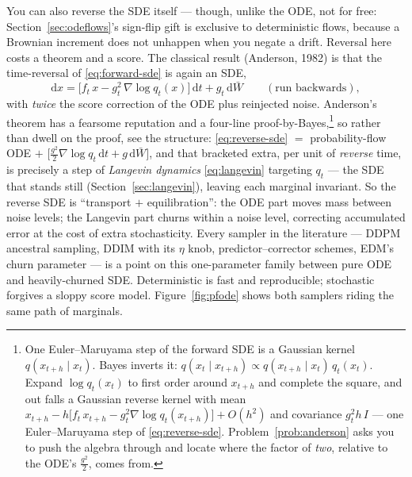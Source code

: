 \documentclass[10pt,a4paper]{article}
\newcommand{\dd}{\mathrm{d}}
\begin{document}
You can also reverse the SDE itself --- though, unlike the ODE, not for
free: Section~\ref{sec:odeflows}'s sign-flip gift is exclusive to
deterministic flows, because a Brownian increment does not unhappen when
you negate a drift. Reversal here costs a theorem and a score. The
classical result (Anderson, 1982)
is that the time-reversal of \eqref{eq:forward-sde} is again an SDE,
\begin{equation}
\dd x = \big[ f_t\, x - g_t^2\, \nabla\log q_t(x) \big]\, \dd t
+ g_t\, \dd \bar W \qquad (\text{run backwards}),
\label{eq:reverse-sde}
\end{equation}
with \emph{twice} the score correction of the ODE plus reinjected noise.
Anderson's theorem has a fearsome reputation and a four-line
proof-by-Bayes,\footnote{One Euler--Maruyama step of the forward SDE is
a Gaussian kernel $q(x_{t+h} \mid x_t)$. Bayes inverts it:
$q(x_t \mid x_{t+h}) \propto q(x_{t+h} \mid x_t)\, q_t(x_t)$. Expand
$\log q_t(x_t)$ to first order around $x_{t+h}$ and complete the square,
and out falls a Gaussian reverse kernel with mean
$x_{t+h} - h\big[ f_t\, x_{t+h} - g_t^2 \nabla\log q_t(x_{t+h}) \big] + O(h^2)$ and
covariance $g_t^2 h\, I$ --- one Euler--Maruyama step of
\eqref{eq:reverse-sde}. Problem~\ref{prob:anderson} asks you to push the
algebra through and locate where the factor of \emph{two}, relative to
the ODE's $\tfrac{g^2}{2}$, comes from.} so rather than dwell on the
proof, see the structure: \eqref{eq:reverse-sde}
$=$ probability-flow ODE $+$ $\big[\tfrac{g^2}{2}\nabla\log q_t\,\dd t +
g\,\dd\bar W\big]$, and that bracketed extra, per unit of \emph{reverse}
time, is precisely a step of
\emph{Langevin dynamics} \eqref{eq:langevin} targeting $q_t$ --- the SDE
that stands still (Section~\ref{sec:langevin}), leaving each marginal
invariant. So the reverse SDE is ``transport $+$ equilibration'':
the ODE part moves mass between noise levels; the Langevin part churns
within a noise level, correcting accumulated error at the cost of extra
stochasticity. Every sampler in the literature --- DDPM ancestral
sampling, DDIM with its $\eta$ knob, predictor--corrector schemes, EDM's
churn parameter --- is a point on this one-parameter family between pure
ODE and heavily-churned SDE. Deterministic is fast and reproducible;
stochastic forgives a sloppy score model.
Figure~\ref{fig:pfode} shows both samplers riding the same path of
marginals.
\end{document}
